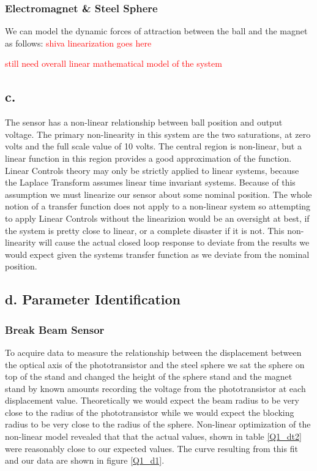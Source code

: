 \documentclass{article}
\newcommand{\xxx}[1]{\textcolor{red}{#1}}
\theoremstyle{plain}
\theoremstyle{definition}
\theoremstyle{remark}
\begin{document}
\subsubsection*{Electromagnet \& Steel Sphere}
We can model the dynamic forces of attraction between the ball and the magnet as follows:
\xxx{shiva linearization goes here}

\xxx{still need overall linear mathematical model of the system}
\subsection*{c.}
The sensor has a non-linear relationship between ball position and output voltage.  The primary non-linearity in this system are the two saturations, at zero volts and the full scale value of 10 volts.  The central region is non-linear, but a linear function in this region provides a good approximation of the function.  Linear Controls theory may only be strictly applied to linear systems, because the Laplace Transform assumes linear time invariant systems.  Because of this assumption we must linearize our sensor about some nominal position.  The whole notion of a transfer function does not apply to a non-linear system so attempting to apply Linear Controls without the linearizion would be an oversight at best, if the system is pretty close to linear, or a complete disaster if it is not.  This non-linearity will cause the actual closed loop response to deviate from the results we would expect given the systems transfer function as we deviate from the nominal position.

\subsection*{d. Parameter Identification}

\subsubsection*{Break Beam Sensor}
To acquire data to measure the relationship between the displacement between the optical axis of the phototransistor and the steel sphere we sat the sphere on top of the stand and changed the height of the sphere stand and the magnet stand by known amounts recording the voltage from the phototransistor at each displacement value.  Theoretically we would expect the beam radius to be very close to the radius of the phototransistor while we would expect the blocking radius to be very close to the radius of the sphere.  Non-linear optimization of the non-linear model revealed that that the actual values, shown in table \ref{Q1_dt2} were reasonably close to our expected values.  The curve resulting from this fit and our data are shown in figure \ref{Q1_d1}.
\end{document}
